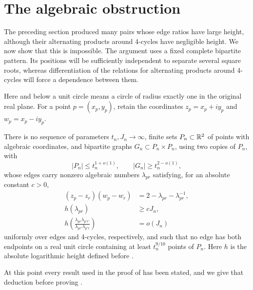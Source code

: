 \section{The algebraic obstruction}\label{sec:algebra}

The preceding section produced many pairs whose edge ratios have large
height, although their alternating products around 4-cycles have
negligible height. We now show that this is impossible. The argument uses
a fixed complete bipartite pattern. Its positions will be sufficiently
independent to separate several square roots, whereas differentiation of
the relations for alternating products around 4-cycles will force a dependence between them.

Here and below a unit circle means a circle of radius exactly one in the
original real plane. For a point \(p=(x_p,y_p)\), retain the coordinates
\(z_p=x_p+iy_p\) and \(w_p=x_p-iy_p\).

\begin{proposition}
\label{alg:obstruction}
There is no sequence of parameters \(t_n,J_n\to\infty\), finite sets
\(P_n\subset\mathbb R^2\) of points with algebraic coordinates, and bipartite
graphs \(G_n\subset P_n\times P_n\), using two copies of \(P_n\),
with
\[
 |P_n|\le t_n^{1+o(1)},\qquad |G_n|\ge t_n^{2-o(1)},
\]
whose edges carry nonzero algebraic numbers \(\lambda_{pr}\) satisfying,
for an absolute constant \(c>0\),
\begin{align}
 (z_p-z_r)(w_p-w_r)
   &=2-\lambda_{pr}-\lambda_{pr}^{-1},
       \label{alg:distance}\\
 h(\lambda_{pr})&\ge cJ_n,
       \label{alg:large-height}\\
 h\left(\frac{\lambda_{pr}\lambda_{p'r'}}
                 {\lambda_{pr'}\lambda_{p'r}}\right)&=o(J_n)
       \label{alg:rectangle}
\end{align}
uniformly over edges and 4-cycles, respectively, and such that
no edge has both endpoints on a real unit circle
containing at least \(t_n^{9/10}\) points of \(P_n\). Here \(h\) is
the absolute logarithmic height defined before .
\end{proposition}

At this point every result used in the proof of  has been
stated, and we give that deduction before proving .

